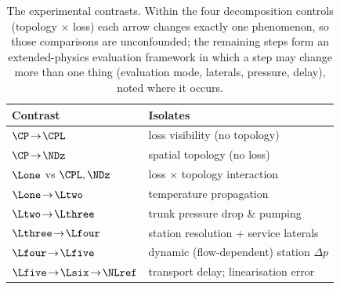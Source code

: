\begin{table}[t]
\centering
\caption{The experimental contrasts. Within the four decomposition controls (topology
$\times$ loss) each arrow changes exactly one phenomenon, so those comparisons are unconfounded;
the remaining steps form an extended-physics evaluation framework in which a step may change
more than one thing (evaluation mode, laterals, pressure, delay), noted where it occurs.}
\label{tab:contrasts}
\begin{tabular}{ll}
\hline
Contrast & Isolates \\
\hline
$\CP\!\to\!\CPL$ & loss visibility (no topology) \\
$\CP\!\to\!\NDz$ & spatial topology (no loss) \\
$\Lone$ vs $\CPL,\NDz$ & loss $\times$ topology interaction \\
$\Lone\!\to\!\Ltwo$ & temperature propagation \\
$\Ltwo\!\to\!\Lthree$ & trunk pressure drop \& pumping \\
$\Lthree\!\to\!\Lfour$ & station resolution + service laterals \\
$\Lfour\!\to\!\Lfive$ & dynamic (flow-dependent) station $\Delta p$ \\
$\Lfive\!\to\!\Lsix\!\to\!\NLref$ & transport delay; linearisation error \\
\hline
\end{tabular}
\end{table}
